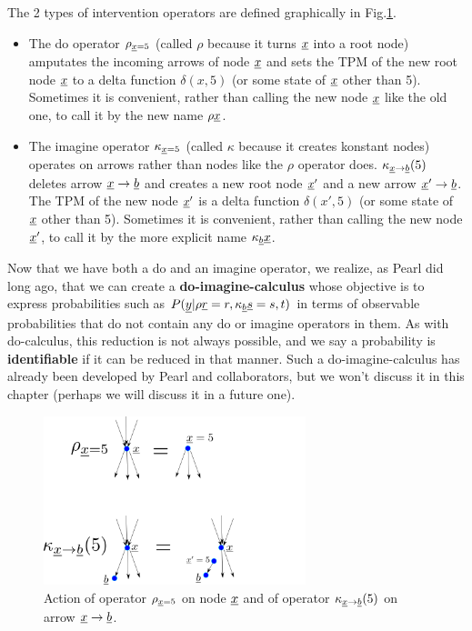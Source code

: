 The 2  types of
intervention operators
are defined 
graphically in Fig.\ref{fig-rho-kappa}.
\begin{itemize}
\item
The do operator $\rho_{{\underline{x}}=5}$
(called $\rho$ because  it turns ${\underline{x}}$
into a root node)
amputates
the incoming arrows of node ${\underline{x}}$
and sets the TPM
of the new root node ${\underline{x}}$
to a delta function $\delta(x, 5)$
(or some state of ${\underline{x}}$ other than 5).
Sometimes it is convenient,
rather than calling the
new node ${\underline{x}}$ like
the old one, to call
it by the new name $\rho{\underline{x}}$.
\item
The imagine operator $\kappa_{{\underline{x}}=5}$
(called $\kappa$ because it
 creates konstant nodes)
operates on arrows
rather than nodes like the 
$\rho$ operator does.
$\kappa_{{\underline{x}}\rightarrow{\underline{b}}}(5)$
deletes
arrow ${\underline{x}}\rightarrow{\underline{b}}$
and
creates a new root node 
${\underline{x}}'$
and a new arrow
${\underline{x}}'\rightarrow {\underline{b}}$. The
TPM of the new node ${\underline{x}}'$ is a 
delta function $\delta(x', 5)$
(or some state of ${\underline{x}}$ other than 5).
Sometimes it is convenient,
rather than calling the
new node ${\underline{x}}'$, to call
it by the 
more
explicit name $\kappa_{\underline{b}}{\underline{x}}$.
\end{itemize}

Now that we have 
both a do and an imagine operator,
we realize,
as Pearl did long ago,
that we can create
a {\bf do-imagine-calculus}
whose
objective
is to 
express
probabilities such as 
$P({\underline{y}}|\rho{\underline{r}}=r, 
\kappa_{\underline{b}} {\underline{s}}=s, t)$
in terms of observable 
probabilities
that do not
contain
any do or imagine
operators in them.
As with
do-calculus,
this reduction
is not 
always possible,
and we say a probability is
{\bf identifiable}
if it  can be reduced
in that manner.
Such a do-imagine-calculus
has already
been developed
by Pearl and collaborators,
but
we won't 
discuss it in this chapter (perhaps
we  will discuss it
in a future one).


\begin{figure}[h!]
\centering
\includegraphics[width=3in]
{counterf/rho-kappa.png}
\caption{Action
of operator $\rho_{{\underline{x}}=5}$
on node ${\underline{x}}$
and of operator 
$\kappa_{{\underline{x}}\rightarrow {\underline{b}}}(5)$
on arrow ${\underline{x}}\rightarrow {\underline{b}}$.} 
\label{fig-rho-kappa}
\end{figure}



